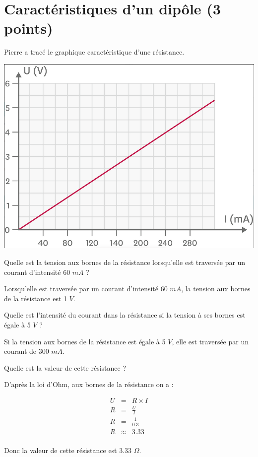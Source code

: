 \section{Caractéristiques d'un dipôle (3 points)}

Pierre a tracé le graphique caractéristique d'une résistance.

\begin{center}
	\includegraphics[scale=0.35]{img/graph}
\end{center}

\begin{questions}
	\question[1] Quelle est la tension aux bornes de la résistance lorsqu'elle est traversée par un courant d'intensité 60 $mA$ ?
	\begin{solution}
		Lorsqu'elle est traversée par un courant d'intensité 60 $mA$, la tension aux bornes de la résistance est 1 $V$.
	\end{solution}
	
	\question[1] Quelle est l'intensité du courant  dans la résistance si la tension à ses bornes est égale à 5 $V$ ?
	\begin{solution}
		Si la tension aux bornes de la résistance est égale à 5 $V$, elle est traversée par un courant de 300 $mA$.
	\end{solution}
	
	\question[1] Quelle est la valeur de cette résistance ?
	\begin{solution}
		D'après la loi d'Ohm, aux bornes de la résistance on a :
		
		\begin{eqnarray*}
			U &=& R \times I \\
			R &=& \frac{U}{I}\\
			R &=& \frac{1}{\num{0.3}}\\
			R &\approx& \num{3.33} \\
		\end{eqnarray*}
	
	Donc la valeur de cette résistance est \num{3.33} $\Omega$.
	\end{solution}
\end{questions}